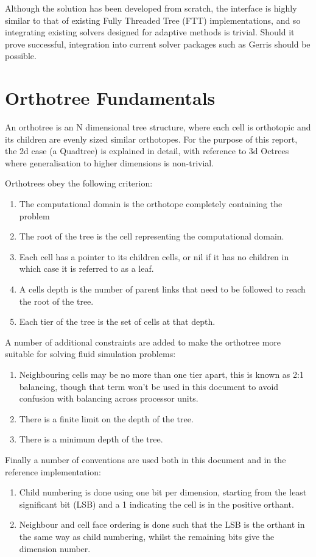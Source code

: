 \documentclass[12pt]{article}
\begin{document}
Although the solution has been developed from scratch, the interface is highly similar to that of existing Fully Threaded Tree (FTT) implementations, and so integrating existing solvers designed for adaptive methods is trivial. Should it prove successful, integration into current solver packages such as Gerris should be possible.

\section{Orthotree Fundamentals}
\label{orthotree}
An orthotree is an N dimensional tree structure, where each cell is orthotopic \cite{coxeter73} and its children are evenly sized similar orthotopes. For the purpose of this report, the 2d case (a Quadtree) is explained in detail, with reference to 3d Octrees where generalisation to higher dimensions is non-trivial. 

Orthotrees obey the following criterion:
\begin{enumerate}
	\item The computational domain is the orthotope completely containing the problem
	\item The root of the tree is the cell representing the computational domain.
	\item Each cell has a pointer to its children cells, or nil if it has no children in which case it is referred to as a leaf.
	\item A cells depth is the number of parent links that need to be followed to reach the root of the tree.
	\item Each tier of the tree is the set of cells at that depth.
\end{enumerate}

A number of additional constraints are added to make the orthotree more suitable for solving fluid simulation problems:
\begin{enumerate}
	\item Neighbouring cells may be no more than one tier apart, this is known as 2:1 balancing, though that term won't be used in this document to avoid confusion with balancing across processor units.
	\item There is a finite limit on the depth of the tree.
	\item There is a minimum depth of the tree.
\end{enumerate}

Finally a number of conventions are used both in this document and in the reference implementation:
\begin{enumerate}
	\item Child numbering is done using one bit per dimension, starting from the least significant bit (LSB) and a 1 indicating the cell is in the positive orthant. 
	\item Neighbour and cell face ordering is done such that the LSB is the orthant in the same way as child numbering, whilst the remaining bits give the dimension number.
\end{enumerate}
\end{document}
